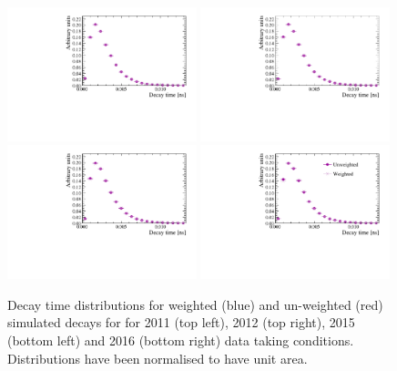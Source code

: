\begin{figure}[tbp]
  \centering
    \includegraphics[width=0.49\textwidth]{./Figs/LifetimeMeasurement/2011_DT_Bs2MuMu.pdf}
    \includegraphics[width=0.49\textwidth]{./Figs/LifetimeMeasurement/2012_DT_Bs2MuMu.pdf}
    \includegraphics[width=0.49\textwidth]{./Figs/LifetimeMeasurement/2015_DT_Bs2MuMu.pdf}
    \includegraphics[width=0.49\textwidth]{./Figs/LifetimeMeasurement/2016_DT_Bs2MuMu.pdf}
  \caption{Decay time distributions for weighted (blue) and un-weighted (red) \bsmumu simulated decays for for 2011 (top left), 2012 (top right), 2015 (bottom left) and 2016 (bottom right) data taking conditions. Distributions have been normalised to have unit area.}
  \label{fig:BsmmDT}
\end{figure}

